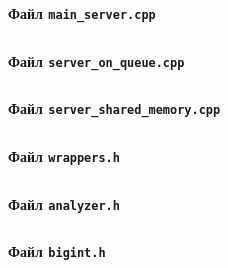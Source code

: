 \documentclass[a4paper,14pt]{extarticle}
\begin{document}
\centerline{\textbf{Файл \texttt{main\_server.cpp}}}

\inputminted{octave}{mainserver.cpp}

\centerline{\textbf{Файл \texttt{server\_on\_queue.cpp}}}

\inputminted{octave}{serveronqueue.cpp}

\centerline{\textbf{Файл \texttt{server\_shared\_memory.cpp}}}

\inputminted{octave}{serveronsharedmemory.cpp}

\centerline{\textbf{Файл \texttt{wrappers.h}}}

\inputminted{octave}{wrappers.h}

\centerline{\textbf{Файл \texttt{analyzer.h}}}

\inputminted{octave}{analyzer.h}

\centerline{\textbf{Файл \texttt{bigint.h}}}

\inputminted{octave}{bigint.h}
\end{document}
